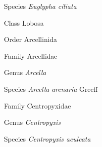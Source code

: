 \documentclass[9pt, article]{memoir}
\begin{document}
\begin{multicols}{2}
\vspace{6pt}\noindent\hspace{36pt}Species \textit{Euglypha ciliata}


\vspace{6pt}\noindent\hspace{12pt}Class Lobosa


\vspace{6pt}\noindent\hspace{18pt}Order Arcellinida


\vspace{6pt}\noindent\hspace{24pt}Family Arcellidae


\vspace{6pt}\noindent\hspace{30pt}Genus \textit{Arcella}


\vspace{6pt}\noindent\hspace{36pt}Species \textit{Arcella arenaria} Greeff


\vspace{6pt}\noindent\hspace{24pt}Family Centropyxidae


\vspace{6pt}\noindent\hspace{30pt}Genus \textit{Centropyxis}


\vspace{6pt}\noindent\hspace{36pt}Species \textit{Centropyxis aculeata}


\end{multicols}
\end{document}
